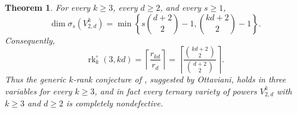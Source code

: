 \documentclass[11pt]{amsart}
\newtheorem{theorem}{Theorem}[section]
\theoremstyle{remark}
\begin{document}
\begin{theorem}\label{thm:ternary-k-rank}
For every $k\ge3$, every $d\ge2$, and every $s\ge1$,
\begin{equation}\label{eq:ternary-nondefectivity}
\dim\sigma_s(V^k_{2,d})
=
\min\left\{
 s\binom{d+2}{2}-1,
 \binom{kd+2}{2}-1
\right\}.
\end{equation}
Consequently,
\begin{equation}\label{eq:ternary-k-rank}
\operatorname{rk}^{\circ}_k(3,kd)
=
\left\lceil
\frac{r_{kd}}{r_d}
\right\rceil
=
\left\lceil
\frac{\binom{kd+2}{2}}{\binom{d+2}{2}}
\right\rceil.
\end{equation}
Thus the generic $k$-rank conjecture of \cite[Conjecture~1.2]{LORS}, suggested by Ottaviani, holds in three variables for every $k\ge3$, and in fact every ternary variety of powers $V^k_{2,d}$ with $k\ge3$ and $d\ge2$ is completely nondefective.
\end{theorem}
\end{document}
